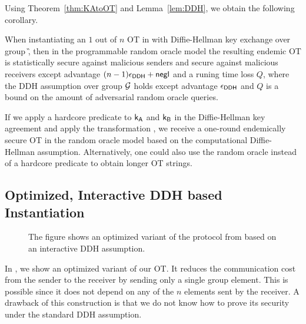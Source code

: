 Using Theorem~\ref{thm:KAtoOT} %
 and Lemma~\ref{lem:DDH}, we obtain the following corollary.

\begin{corollary}
When instantiating an $1$ out of $n$ OT in  with Diffie-Hellman key exchange over group \G, then in the programmable random oracle model the resulting endemic OT is statistically secure against malicious senders and secure against malicious receivers except advantage $(n-1)\epsilon_{\mathsf{DDH}}+\mathsf{negl}$ and a runing time loss $Q$, where the DDH assumption over group $\mathcal{G}$ holds except advantage $\epsilon_{\mathsf{DDH}}$ and $Q$ is a bound on the amount of adversarial random oracle queries.
\end{corollary}

\begin{remark}
If we apply a hardcore predicate to $\mathsf{k}_{\mathsf{A}}$ and $\mathsf{k}_{\mathsf{B}}$ in the Diffie-Hellman key agreement and apply the transformation , we receive a one-round endemically secure OT in the random oracle model based on the computational Diffie-Hellman assumption. Alternatively, one could also use the random oracle instead of a hardcore predicate to obtain longer OT strings. 
\end{remark}

\subsection{Optimized, Interactive DDH based Instantiation}\label{sec:optOT}
\begin{figure}
\centering
{}
\myvspace{-0.3cm}
\caption{The figure shows an optimized variant of the protocol from  based on an interactive DDH assumption.}
\label{fig:optKAtoOT}
\end{figure}
In , we show an optimized variant of our OT. It reduces the communication cost from the sender to the receiver by sending only a single group element. This is possible since it does not depend on any of the $n$ elements sent by the receiver. A drawback of this construction is that we do not know how to prove its security under the standard DDH assumption.

